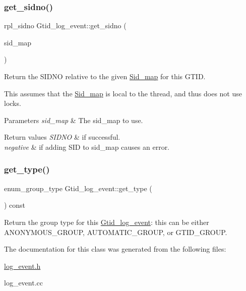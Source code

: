 \subsubsection{\texorpdfstring{get\+\_\+sidno()}{get\_sidno()}\hspace{0.1cm}{\footnotesize\ttfamily [2/2]}}
{\footnotesize\ttfamily rpl\+\_\+sidno Gtid\+\_\+log\+\_\+event\+::get\+\_\+sidno (\begin{DoxyParamCaption}\item[{\mbox{\hyperlink{classSid__map}{Sid\+\_\+map}} $\ast$}]{sid\+\_\+map }\end{DoxyParamCaption})\hspace{0.3cm}{\ttfamily [inline]}}

Return the S\+I\+D\+NO relative to the given \mbox{\hyperlink{classSid__map}{Sid\+\_\+map}} for this G\+T\+ID.

This assumes that the \mbox{\hyperlink{classSid__map}{Sid\+\_\+map}} is local to the thread, and thus does not use locks.


\begin{DoxyParams}{Parameters}
{\em sid\+\_\+map} & The sid\+\_\+map to use. \\
\hline
\end{DoxyParams}

\begin{DoxyRetVals}{Return values}
{\em S\+I\+D\+NO} & if successful. \\
\hline
{\em negative} & if adding S\+ID to sid\+\_\+map causes an error. \\
\hline
\end{DoxyRetVals}
\mbox{\label{classGtid__log__event_a3618edb29b6de3fb20a330e6ca5e8e74}} 
\subsubsection{\texorpdfstring{get\+\_\+type()}{get\_type()}}
{\footnotesize\ttfamily enum\+\_\+group\+\_\+type Gtid\+\_\+log\+\_\+event\+::get\+\_\+type (\begin{DoxyParamCaption}{ }\end{DoxyParamCaption}) const\hspace{0.3cm}{\ttfamily [inline]}}

Return the group type for this \mbox{\hyperlink{classGtid__log__event}{Gtid\+\_\+log\+\_\+event}}\+: this can be either A\+N\+O\+N\+Y\+M\+O\+U\+S\+\_\+\+G\+R\+O\+UP, A\+U\+T\+O\+M\+A\+T\+I\+C\+\_\+\+G\+R\+O\+UP, or G\+T\+I\+D\+\_\+\+G\+R\+O\+UP. 

The documentation for this class was generated from the following files\+:\begin{DoxyCompactItemize}
\item 
\mbox{\hyperlink{log__event_8h}{log\+\_\+event.\+h}}\item 
log\+\_\+event.\+cc\end{DoxyCompactItemize}
